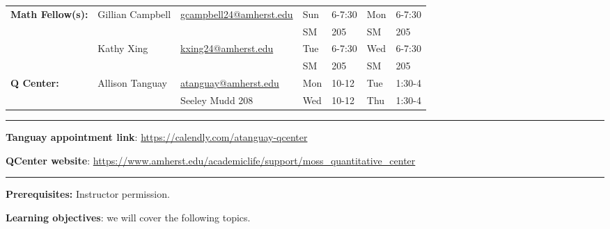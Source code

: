\documentclass[12pt]{article}
\begin{document}

\noindent \begin{tabular}{@{}lllllll}
\textbf{Math Fellow(s):} & Gillian Campbell & \href{mailto: gcampbell24@amherst.edu}{gcampbell24@amherst.edu} 
   & Sun & 6-7:30 & Mon & 6-7:30 \\
\medskip
 & &     &     SM & 205 & SM & 205\\ 
                        & Kathy Xing & \href{mailto: kxing24@amherst.edu}{kxing24@amherst.edu} 
   & Tue & 6-7:30 & Wed & 6-7:30 \\
\medskip
 & &     & SM  & 205 & SM & 205\\ 
\textbf{Q Center:}& Allison Tanguay & \href{mailto: atanguay@amherst.edu}{atanguay@amherst.edu}  
  &Mon &10-12 & Tue &1:30-4  \\
 &&Seeley Mudd 208&Wed&10-12&Thu&1:30-4
\end{tabular}

\smallskip \hrule \medskip          
\noindent\textbf{Tanguay appointment link}: \url{https://calendly.com/atanguay-qcenter}
\medskip

\noindent\textbf{QCenter website}: \url{https://www.amherst.edu/academiclife/support/moss_quantitative_center}

\medskip \hrule \medskip

\noindent\textbf{Prerequisites:} Instructor permission.
\smallskip

\noindent \textbf{Learning objectives}: we will cover the following topics.
\end{document}

